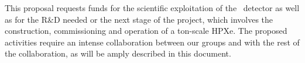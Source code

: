 
 \indent
 
 This proposal requests funds for the scientific exploitation of the \Next\ detector as well as for the R\&D needed or the next stage of the project, 
 which involves the construction, commissioning and operation of a ton-scale HPXe. The proposed activities require an intense collaboration between our groups and with the rest of the collaboration, as will be amply described in this document. 
 
 
 
